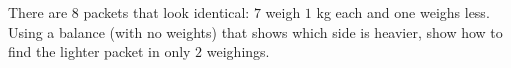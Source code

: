 There are $8$ packets that look identical: $7$ weigh $1$ kg each and one weighs less. Using a balance (with no weights) that shows which side is heavier, show how to find the lighter packet in only $2$ weighings.
